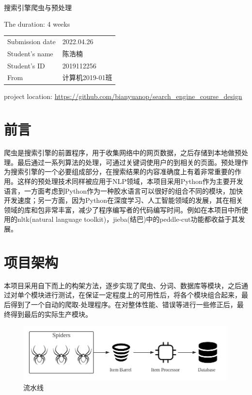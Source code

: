 \documentclass{article}
\begin{document}
\begin{CJK*}{UTF8}{gbsn}

\begin{titlepage}
\centering


\Large 搜索引擎爬虫与预处理


\normalsize The duration: 4 weeks

\begin{tabular}{ll}
Submission date & 2022.04.26 \\[2ex]
Student's name  & 陈浩楠 \\[2ex]
Student's ID & 2019112256\\[2ex]
From            & 计算机2019-01班
\end{tabular}



project location: 
\url{https://github.com/bianyuanop/search_engine_course_design}
\end{titlepage}

\tableofcontents
\pagebreak

\section{前言}
爬虫是搜索引擎的前置程序，用于收集网络中的网页数据，之后存储到本地做预处理。最后通过一系列算法的处理，可通过关键词使用户的到相关的页面。预处理作为搜索引擎的一个必要组成部分，在搜索结果的内容准确度上有着非常重要的作用。这样的预处理技术同样被应用于NLP领域，本项目采用Python作为主要开发语言，一方面考虑到Python作为一种胶水语言可以很好的组合不同的模块，加快开发速度；另一方面，因为Python在深度学习、人工智能领域的发展，其在相关领域的库和包非常丰富，减少了程序编写者的代码编写时间。例如在本项目中所使用的nltk(natural language toolkit)，jieba(结巴)中的peddle-cut功能都收益于其发展。

\section{项目架构}
本项目采用自下而上的构架方法，逐步实现了爬虫、分词、数据库等模块，之后通过对单个模块进行测试，在保证一定程度上的可用性后，将各个模块组合起来，最后得到了一个自动的爬取-处理程序。在对整体性能、错误等进行一些修正后，最终得到最后的实际生产模块。
\begin{figure}[H]
\centering
\includegraphics[height=3cm]{pipeline.png}
\caption{流水线}
\end{figure}

\end{CJK*}
\end{document}
